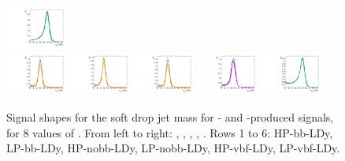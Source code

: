 \begin{figure}[htbp]
  \includegraphics[width=0.18\textwidth]{fig/2Dfit/templateSignalVsMX_fromDC_WprToWH_MJJ_mu_HP_vbf_LDy.pdf}\\
  \includegraphics[width=0.18\textwidth]{fig/2Dfit/templateSignalVsMX_fromDC_GbuToWW_MJJ_mu_LP_vbf_LDy.pdf}
  \includegraphics[width=0.18\textwidth]{fig/2Dfit/templateSignalVsMX_fromDC_RadToWW_MJJ_mu_LP_vbf_LDy.pdf}
  \includegraphics[width=0.18\textwidth]{fig/2Dfit/templateSignalVsMX_fromDC_ZprToWW_MJJ_mu_LP_vbf_LDy.pdf}
  \includegraphics[width=0.18\textwidth]{fig/2Dfit/templateSignalVsMX_fromDC_WprToWZ_MJJ_mu_LP_vbf_LDy.pdf}
  \includegraphics[width=0.18\textwidth]{fig/2Dfit/templateSignalVsMX_fromDC_WprToWH_MJJ_mu_LP_vbf_LDy.pdf}\\
  \caption{
    Signal shapes for the soft drop jet mass \MJ for \ggF- and \DY-produced signals, for 8 values of \MX.
    From left to right: \GBulktoWW, \RadtoWW, \ZprtoWW, \WprtoWZ, \WprtoWH.
    Rows 1 to 6: HP-bb-LDy, LP-bb-LDy, HP-nobb-LDy, LP-nobb-LDy, HP-vbf-LDy, LP-vbf-LDy.
  }
  \label{fig:MJJShapes_NonVBF_LDy_Run2}
\end{figure}

